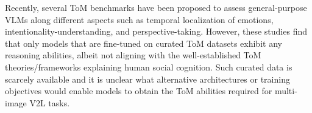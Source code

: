 Recently, several ToM benchmarks have been proposed to assess general-purpose VLMs \cite{tom2,tom3} along different aspects such as temporal localization of emotions, intentionality-understanding, and perspective-taking. However, these studies find that only models that are fine-tuned on curated ToM datasets exhibit any reasoning abilities, albeit not aligning with the well-established ToM theories/frameworks explaining human social cognition. Such curated data is scarcely available and it is unclear what alternative architectures or training objectives would enable models to obtain the ToM abilities required for multi-image V2L tasks.